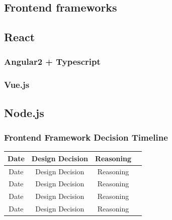 \documentclass[12pt]{article}
\begin{document}
	\subsection{Frontend frameworks}
	\paragraph{}
		
		
	\subsection{React}
	
	\subsubsection{Angular2 + Typescript}
	
	\subsubsection{Vue.js}
	
	\subsection{Node.js}
	
	\subsubsection{Frontend Framework Decision Timeline}
	

		\begin{center}
		\begin{tabular}{ |c|c|c|c| } 
		\hline
		Date & Design Decision & Reasoning \\
		\hline
		Date & Design Decision & Reasoning \\
		\hline
		Date & Design Decision & Reasoning \\
		\hline
		Date & Design Decision & Reasoning \\
		\hline
		Date & Design Decision & Reasoning \\
		\hline
		\end{tabular}
		\end{center}	

\end{document}
